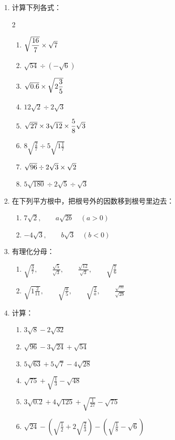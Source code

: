 \begin{enumerate}
\item 计算下列各式：
\begin{multicols}{2}
\begin{enumerate}
    \item $\sqrt{\dfrac{16}{7}}\times \sqrt{7}$
    \item $\sqrt{54}\div \left(-\sqrt{6}\right)$
    \item $\sqrt{0.6}\times \sqrt{2\dfrac{3}{5}}$
    \item $12\sqrt{2}\div 2\sqrt{3}$
    \item $\sqrt{27}\times 3\sqrt{12}\times \dfrac{5}{8}\sqrt{3}$
    \item $8\sqrt{\frac{2}{7}}\div 5\sqrt{1\frac{1}{7}}$
    \item $\sqrt{96}\div 2\sqrt{3}\times \sqrt{2}$
    \item $5\sqrt{180}\div 2\sqrt{5}\div \sqrt{3}$
\end{enumerate}
\end{multicols}

\item 在下列平方根中，把根号外的因数移到根号里边去：
\begin{enumerate}
    \item $7\sqrt{2},\qquad a\sqrt{2b}\quad (a>0)$
    \item $-4\sqrt{3},\qquad b\sqrt{3}\quad (b<0)$
\end{enumerate}

\item 有理化分母：
\begin{enumerate}
    \item $\sqrt{\frac{3}{7}},\qquad \frac{\sqrt{5}}{\sqrt{3}},\qquad \frac{\sqrt{12}}{\sqrt{3}},\qquad \sqrt{\frac{7}{6}}$
    \item $\sqrt{1\frac{2}{11}},\qquad \sqrt{\frac{a}{5}},\qquad \sqrt{\frac{2}{a}},\qquad \frac{\sqrt{m}}{\sqrt{2b}} $
\end{enumerate}

\item 计算：
\begin{enumerate}
    \item $3\sqrt{8}-2\sqrt{32}$
    \item $\sqrt{96}-3\sqrt{24}+\sqrt{54}$
    \item $5\sqrt{63}+5\sqrt{7}-4\sqrt{28}$
    \item $\sqrt{75}+\sqrt{\frac{1}{3}}-\sqrt{48}$
    \item $3\sqrt{0.2}+4\sqrt{125}+\sqrt{\frac{1}{27}}-\sqrt{75}$
    \item $\sqrt{24}-\left(\sqrt{\frac{1}{2}}+2\sqrt{\frac{2}{3}}\right)-\left(\sqrt{\frac{1}{8}}-\sqrt{6}\right)$
\end{enumerate}


\end{enumerate}

